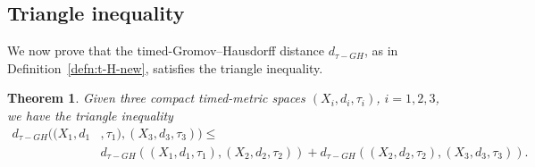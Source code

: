 \documentclass[a4paper,12pt,reqno]{amsart}
\theoremstyle{plain}
\newtheorem{thm}{Theorem}[section]
\newcommand{\be}{\begin{equation}}
\newcommand{\ee}{\end{equation}}
\begin{document}
\subsection{
Triangle inequality}


We now prove that the timed-Gromov--Hausdorff distance $d_{\tau-GH}$, as in Definition~\ref{defn:t-H-new}, satisfies the triangle inequality.  

\begin{thm}\label{thm:triangle}
Given three compact timed-metric spaces $(X_i,d_i,\tau_i)$, $i=1,2,3$, we have the triangle
inequality
\be
\begin{split}
d_{\tau-GH}((X_1,d_1&,\tau_1), (X_3,d_3,\tau_3))
\le\\
&d_{\tau-GH}((X_1,d_1,\tau_1),(X_2,d_2,\tau_2))
+
d_{\tau-GH}((X_2,d_2,\tau_2),(X_3,d_3,\tau_3)).
\end{split}
\ee
\end{thm}
\end{document}
